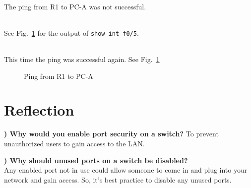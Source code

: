 \documentclass{report}
\newcommand{\mysection}[1]{\section*{#1}}
\newcommand{\mysubsection}[2]{\textbf{\romannumeral #1) #2}}
\begin{document}
\\The ping from R1 to PC-A was not successful. 


\\See Fig.~\ref{R1ping10} for the output of
{\scriptsize{\verb$show int f0/5$}\normalsize}.


\\This time the ping was successful again. See
Fig.~\ref{R1ping10}


\begin{figure}[!hbt]\centering
{}\par
{}\par 
{}\par 
\caption{Ping from R1 to PC-A}
\label{R1ping10}
\end{figure}



\mysection{\textbf{Reflection}}

\mysubsection{1}{Why would you enable port security on a switch?}
To prevent unauthorized users to gain access to the LAN.


\noindent\mysubsection{2}{Why should unused ports on a switch be disabled?}
\\Any enabled port not in use could allow someone to come in and plug into
your network and gain access. So, it's best practice to disable any unused
ports.

\end{document}

